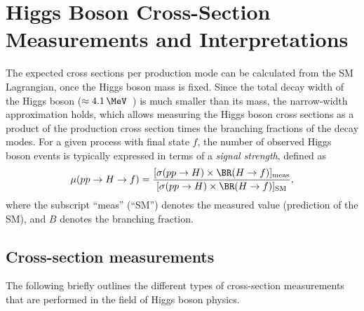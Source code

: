 \section{Higgs Boson Cross-Section Measurements and Interpretations}
\label{subsec:xsec-measurements}



The expected cross sections per production mode can be calculated from the SM Lagrangian, once the Higgs boson mass is fixed.
Since the total decay width of the Higgs boson ($\approx 4.1\,\MeV$~\cite{deFlorian:2016spz}) is much smaller than its mass, the narrow-width approximation holds, which allows measuring the Higgs boson cross sections as a product of the production cross section times the branching fractions of the decay modes.
For a given process with final state $f$, the number of observed Higgs boson events is typically expressed in terms of a \emph{signal strength}, defined as 
\begin{equation}
  \label{eq:signal-strength}
  \mu(pp \to H \to f) = \frac{ [ \sigma(pp \to H)  \times \BR(H \to f) ]_\text{meas} } { [ \sigma(pp \to H) \times \BR(H \to f) ]_\text{SM}},
\end{equation}
where the subscript ``meas'' (``SM'') denotes the measured value (prediction of the SM), and $B$ denotes the branching fraction. 

\subsection{Cross-section measurements}
The following briefly outlines the different types of cross-section measurements that are performed in the field of Higgs boson physics. 

